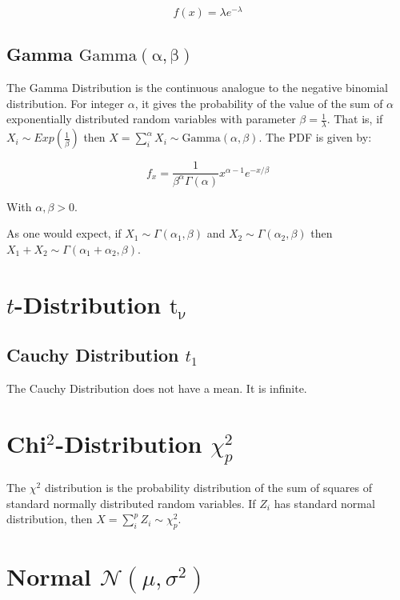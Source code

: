\begin{equation}
f(x) = \lambda e^{-\lambda}
\end{equation}


\subsection{Gamma $\mathrm{Gamma(\alpha,\beta)}$}
The Gamma Distribution is the continuous analogue to the negative binomial distribution. For integer $\alpha$, it gives the probability of the value of the sum of $\alpha$ exponentially distributed random variables with parameter $\beta=\frac{1}{\lambda}$. That is, if $X_i \sim Exp(\frac{1}{\beta})$ then $X = \sum_i^\alpha X_i \sim \mathrm{Gamma}(\alpha,\beta)$. The PDF is given by:

\begin{equation}
f_x = \frac{1}{\beta^\alpha \Gamma(\alpha)}x^{\alpha-1}e^{-x/\beta}
\end{equation}

With $\alpha,\beta > 0$.

As one would expect, if $X_1 \sim \Gamma(\alpha_1,\beta)$ and $X_2 \sim \Gamma(\alpha_2,\beta)$ then $X_1 + X_2 \sim \Gamma(\alpha_1+\alpha_2,\beta)$. 



\section{$t$-Distribution $\mathrm{t_\nu\ }$}

\subsection{Cauchy Distribution $t_1$}
The Cauchy Distribution does not have a mean. It is infinite.


\section{Chi$^2$-Distribution $\chi^2_p$}
The $\chi^2$ distribution is the probability distribution of the sum of squares of standard normally distributed random variables. If $Z_i$ has standard normal distribution, then $X = \sum_i^p Z_i \sim \chi^2_p$.



\section{Normal $\mathscr{N}(\mu,\sigma^2)$}


